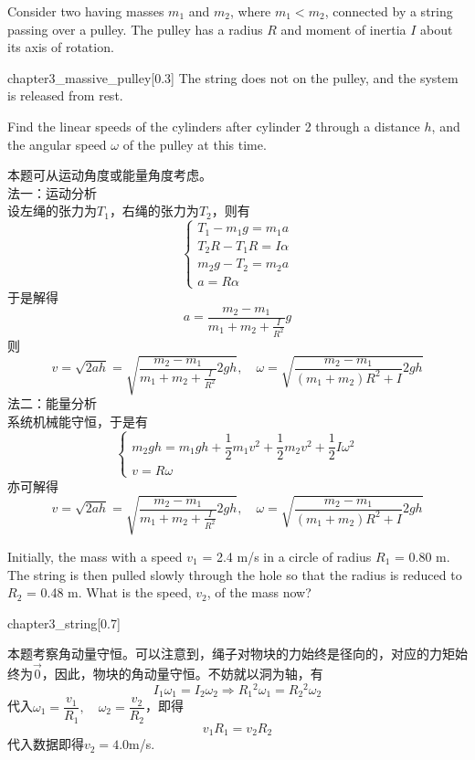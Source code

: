 \begin{solution}
    Consider two  having masses $m_1$
    and $m_2$, where $m_1 < m_2$, connected by a
    string passing over a pulley. The pulley
    has a radius $R$ and moment of inertia $I$
    about its axis of rotation.
    \begin{singlefigure}{chapter3_massive_pulley}[0.3]
        The string does
        not  on the pulley, and the system
        is released from rest.
    \end{singlefigure}
    Find the linear
    speeds of the cylinders after
    cylinder 2  through a
    distance $h$, and the angular
    speed $\omega$ of the pulley at this time.

    \tcbrule

    本题可从运动角度或能量角度考虑。\\
    法一：运动分析\\
    设左绳的张力为$T_1$，右绳的张力为$T_2$，则有
    \[\left\{\begin{array}{c}
            T_1-m_1g=m_1a     \\
            T_2R-T_1R=I\alpha \\
            m_2g-T_2=m_2a     \\
            a=R\alpha
        \end{array}\right.\]
    于是解得
    \[a=\dfrac{m_2-m_1}{m_1+m_2+\frac{I}{R^2}}g\]
    则
    \[v=\sqrt{2ah}=\sqrt{\dfrac{m_2-m_1}{m_1+m_2+\frac{I}{R^2}}2gh},\quad\omega=\sqrt{\dfrac{m_2-m_1}{(m_1+m_2)R^2+I}2gh}\]
    法二：能量分析\\
    系统机械能守恒，于是有
    \[\left\{\begin{array}{c}
            m_2gh=m_1gh+\dfrac{1}{2}m_1v^2+\dfrac{1}{2}m_2v^2+\dfrac{1}{2}I\omega^2 \\
            v=R\omega
        \end{array}\right.\]
    亦可解得
    \[v=\sqrt{2ah}=\sqrt{\dfrac{m_2-m_1}{m_1+m_2+\frac{I}{R^2}}2gh},\quad\omega=\sqrt{\dfrac{m_2-m_1}{(m_1+m_2)R^2+I}2gh}\]
\end{solution}
\begin{solution}
    Initially, the mass  with a speed $v_1$ = 2.4 m/s in
    a circle of radius $R_1$ = 0.80 m.
    The string is then pulled slowly through the hole so
    that the radius is reduced to $R_2$ = 0.48 m. What is the
    speed, $v_2$, of the mass now?
    \begin{singlefigure}{chapter3_string}[0.7]
    \end{singlefigure}

    \tcbrule

    本题考察角动量守恒。可以注意到，绳子对物块的力始终是径向的，对应的力矩始终为$\vec{0}$，因此，物块的角动量守恒。不妨就以洞为轴，有
    \[I_1\omega_1=I_2\omega_2\Rightarrow R_1{}^2\omega_1=R_2{}^2\omega_2\]
    代入$\omega_1=\dfrac{v_1}{R_1},\quad\omega_2=\dfrac{v_2}{R_2}$，即得
    \[v_1R_1=v_2R_2\]
    代入数据即得$v_2=4.0$m/s.
\end{solution}


